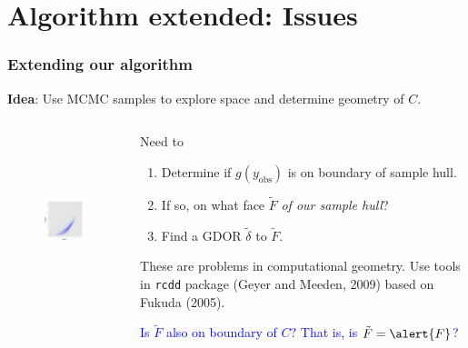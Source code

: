 \documentclass[ 10pt]{beamer}
\newcommand{\yobs}{y_{\text{obs}}}
\begin{document}
\section{Algorithm extended: Issues}
\frame
{
\frametitle{Extending our algorithm}  

\textbf{Idea}: Use MCMC samples to explore space and
determine geometry of $C$.
\vspace{1mm}

\begin{columns}[]
\begin{column}[T]{0.3\textwidth}
\begin{figure}[h]
\centering
\includegraphics[height=2in, trim=2.5in 1in 1in 1.9in, clip = true ]{MCsample-interiorptonF} %
\end{figure}
\end{column}

\begin{column}[t]{0.7\textwidth}
\pause

Need to
\vspace{1mm}
\begin{enumerate}
\item Determine if $g(\yobs)$ is on boundary of sample hull.
\vspace{2mm}
\item If so, on what face $\tilde{F}$ \emph{of our sample hull}?
\vspace{2mm}
\item Find a GDOR $\tilde{\delta}$ to $\tilde{F}$.   
\end{enumerate}
\vspace{2mm}
These are problems in computational geometry.  Use tools in \texttt{rcdd} package (Geyer and Meeden, 2009) based on Fukuda (2005).
\vspace{4mm}
\pause

\textcolor{blue}{Is $\tilde{F}$ also on boundary of $C$?  That is, is $\tilde{F} = \alert{F}$?}
\end{column}
\end{columns}
}
\end{document}
